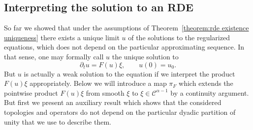 \documentclass[11pt,a4paper]{article}
\theoremstyle{remark}
\newcommand{\CC}{\ensuremath{\mathscr{C}}}
\begin{document}
\subsection{Interpreting the solution to an RDE}

  So far we showed that under the assumptions of Theorem~\ref{theorem:rde existence uniqueness} there exists a unique limit $u$ of the solutions to the
  regularized equations, which does not depend on the particular approximating
  sequence. In that sense, one may formally call $u$ the unique solution to
  \[
     \partial_{t} u=F ( u ) \xi , \hspace{2em} u ( 0 ) =u_{0} .
  \]
  But $u$ is actually a weak solution to the equation if we interpret the product $F(u) \xi$ appropriately. Below we will introduce a map $\pi_F$ which extends the pointwise product $F(u) \xi$ from smooth $\xi$ to $\xi \in \CC^{\alpha-1}$ by a continuity argument. But first we present an auxiliary result which shows that the considered topologies and operators do not depend on the particular dyadic
partition of unity that we use to describe them.
\end{document}
